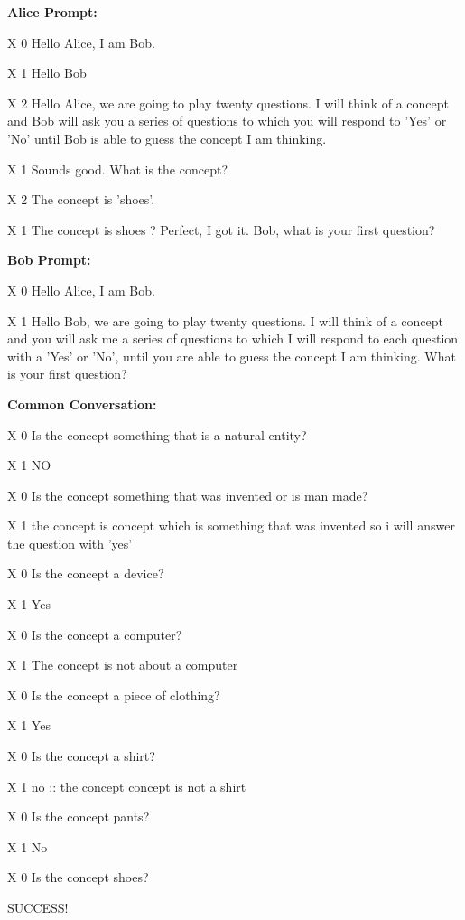 \begin{tcolorbox}[colback=blue!5!white,colframe=blue!75!black]
\textbf{Alice Prompt:}


X 0 Hello Alice, I am Bob.

X 1 Hello Bob 

X 2 Hello Alice, we are going to play twenty questions. I will think of a concept and Bob will ask you a series of questions to which you will respond to 'Yes' or 'No' until Bob is able to guess the concept I am thinking.

X 1 Sounds good. What is the concept?

X 2 The concept is 'shoes'.

X 1 The concept is shoes ? Perfect, I got it. Bob, what is your first question?

\textbf{Bob Prompt:}

X 0 Hello Alice, I am Bob.

X 1 Hello Bob, we are going to play twenty questions. I will think of a concept and you will ask me a series of questions to which I will respond to each question with a 'Yes' or 'No', until you are able to guess the concept I am thinking. What is your first question?

\textbf{Common Conversation:}


X 0 Is the concept {\color{red} something that is a natural entity?}

X 1 {\color{blue} NO}

X 0 Is the concept {\color{red} something that was invented or is man made?}

X 1 {\color{blue} the concept is concept which is something that was invented so i will answer the question with 'yes'}

X 0 Is the concept {\color{red} a device?}

X 1 {\color{blue} Yes}

X 0 Is the concept {\color{red} a computer?}

X 1 {\color{blue} The concept is not about a computer}

X 0 Is the concept {\color{red} a piece of clothing?}

X 1{\color{blue}  Yes}

X 0 Is the concept {\color{red} a shirt?}

X 1 {\color{blue} no :: the concept concept is not a shirt}

X 0 Is the concept {\color{red}  pants?}

X 1 {\color{blue}  No}

X 0 Is the concept {\color{red} shoes?}

SUCCESS!


\end{tcolorbox}


